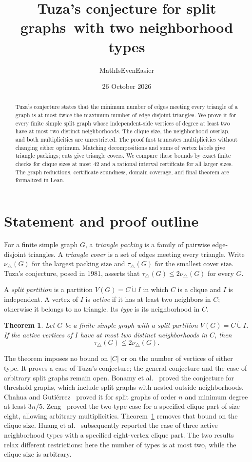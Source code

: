 \documentclass[11pt]{article}
\title{Tuza's conjecture for split graphs\ with two neighborhood types}
\author{MathIsEvenEasier}
\date{26 October 2026}
\newtheorem{theorem}{Theorem}
\newcommand{\tp}{\nu_{\triangle}}
\newcommand{\tc}{\tau_{\triangle}}
\begin{document}
\maketitle
\begin{abstract}
Tuza's conjecture states that the minimum number of edges meeting every
triangle of a graph is at most twice the maximum number of edge-disjoint
triangles. We prove it for every finite simple split graph whose
independent-side vertices of degree at least two have at most two distinct
neighborhoods. The clique size, the neighborhood overlap, and both
multiplicities are unrestricted. The proof first truncates multiplicities
without changing either optimum. Matching decompositions and sums of
vertex labels give triangle packings; cuts give triangle covers.
We compare these bounds by exact finite checks for clique sizes at most
42 and a rational interval certificate for all larger sizes. The graph
reductions, certificate soundness, domain coverage, and final theorem
are formalized in Lean.
\end{abstract}

\section{Statement and proof outline}
For a finite simple graph $G$, a \emph{triangle packing} is a family of
pairwise edge-disjoint triangles. A \emph{triangle cover} is a set of
edges meeting every triangle. Write $\tp(G)$ for the largest packing
size and $\tc(G)$ for the smallest cover size. Tuza's conjecture, posed
in 1981, asserts that $\tc(G)\leq2\tp(G)$ for every $G$.

A \emph{split partition} is a partition $V(G)=C\mathbin{\dot\cup}I$
in which $C$ is a clique and $I$ is independent. A vertex of $I$ is
\emph{active} if it has at least two neighbors in $C$; otherwise it
belongs to no triangle. Its \emph{type} is its neighborhood in $C$.

\begin{theorem}\label{thm:two-types-all}
Let $G$ be a finite simple graph with a split partition
$V(G)=C\mathbin{\dot\cup}I$. If the active vertices of $I$ have at most
two distinct neighborhoods in $C$, then
\[
 \tc(G)\leq2\tp(G).
\]
\end{theorem}

The theorem imposes no bound on $|C|$ or on the number of vertices of
either type. It proves a case of Tuza's conjecture; the general
conjecture and the case of arbitrary split graphs remain open.
Bonamy et al.~\cite{bonamy} proved the conjecture for threshold graphs,
which include split graphs with nested outside neighborhoods.
Chahua and Guti\'errez~\cite{dense} proved it for split graphs of order
$n$ and minimum degree at least $3n/5$.
Zeng~\cite{zeng} proved the two-type case for a specified clique part
of size eight, allowing arbitrary multiplicities. Theorem~\ref{thm:two-types-all}
removes that bound on the clique size.
Huang et al.~\cite{epi} subsequently reported the case of three active
neighborhood types with a specified eight-vertex clique part. The two
results relax different restrictions: here the number of types is at
most two, while the clique size is arbitrary.
\end{document}
